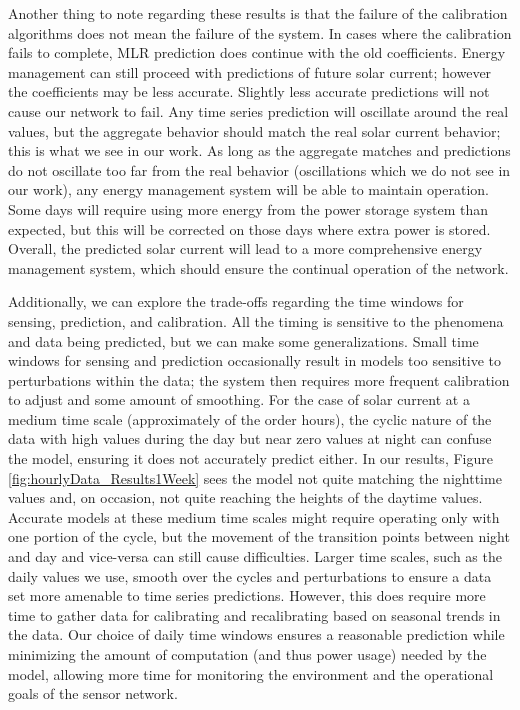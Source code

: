 \documentclass[prodmode,acmtosn]{acmsmall}
\begin{document}
Another thing to note regarding these results is that the failure of the calibration algorithms does not mean the failure of the system.
In cases where the calibration fails to complete, MLR prediction does continue with the old coefficients.
Energy management can still proceed with predictions of future solar current; however the coefficients may be less accurate.
Slightly less accurate predictions will not cause our network to fail.
Any time series prediction will oscillate around the real values, but the aggregate behavior should match the real solar current behavior; this is what we see in our work.
As long as the aggregate matches and predictions do not oscillate too far from the real behavior (oscillations which we do not see in our work), any energy management system will be able to maintain operation.
Some days will require using more energy from the power storage system than expected, but this will be corrected on those days where extra power is stored.
Overall, the predicted solar current will lead to a more comprehensive energy management system, which should ensure the continual operation of the network.

Additionally, we can explore the trade-offs regarding the time windows for sensing, prediction, and calibration.
All the timing is sensitive to the phenomena and data being predicted, but we can make some generalizations.
Small time windows for sensing and prediction occasionally result in models too sensitive to perturbations within the data; the system then requires more frequent calibration to adjust and some amount of smoothing.
For the case of solar current at a medium time scale (approximately of the order hours), the cyclic nature of the data with high values during the day but near zero values at night can confuse the model, ensuring it does not accurately predict either.
In our results, Figure \ref{fig:hourlyData_Results1Week} sees the model not quite matching the nighttime values and, on occasion, not quite reaching the heights of the daytime values.
Accurate models at these medium time scales might require operating only with one portion of the cycle, but the movement of the transition points between night and day and vice-versa can still cause difficulties.
Larger time scales, such as the daily values we use, smooth over the cycles and perturbations to ensure a data set more amenable to time series predictions.
However, this does require more time to gather data for calibrating and recalibrating based on seasonal trends in the data.
Our choice of daily time windows ensures a reasonable prediction while minimizing the amount of computation (and thus power usage) needed by the model, allowing more time for monitoring the environment and the operational goals of the sensor network.
\end{document}
